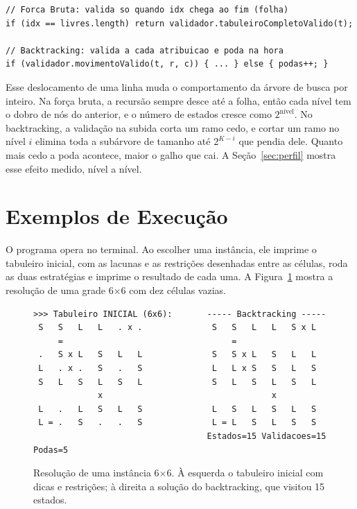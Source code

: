 \documentclass[12pt]{article}
\begin{document}
\begin{lstlisting}
// Forca Bruta: valida so quando idx chega ao fim (folha)
if (idx == livres.length) return validador.tabuleiroCompletoValido(t);

// Backtracking: valida a cada atribuicao e poda na hora
if (validador.movimentoValido(t, r, c)) { ... } else { podas++; }
\end{lstlisting}

Esse deslocamento de uma linha muda o comportamento da árvore de busca por inteiro. Na força bruta, a recursão sempre desce até a folha, então cada nível tem o dobro de nós do anterior, e o número de estados cresce como $2^{\text{nível}}$. No backtracking, a validação na subida corta um ramo cedo, e cortar um ramo no nível $i$ elimina toda a subárvore de tamanho até $2^{K-i}$ que pendia dele. Quanto mais cedo a poda acontece, maior o galho que cai. A Seção~\ref{sec:perfil} mostra esse efeito medido, nível a nível.

\section{Exemplos de Execução}
\label{sec:exemplos}

O programa opera no terminal. Ao escolher uma instância, ele imprime o tabuleiro inicial, com as lacunas e as restrições desenhadas entre as células, roda as duas estratégias e imprime o resultado de cada uma. A Figura~\ref{fig:exec6} mostra a resolução de uma grade 6$\times$6 com dez células vazias.

\begin{figure}[!ht]
\centering
\begin{footnotesize}
\begin{verbatim}
>>> Tabuleiro INICIAL (6x6):       ----- Backtracking -----
 S   S   L   L   . x .              S   S   L   L   S x L
     =                                  =
 .   S x L   S   L   L              S   S x L   S   L   L
 L   . x .   S   .   S              L   L x S   S   L   S
 S   L   S   L   S   L              S   L   S   L   S   L
             x                                  x
 L   .   L   S   L   S              L   S   L   S   L   S
 L = .   S   .   .   S              L = L   S   L   S   S
                                   Estados=15 Validacoes=15 Podas=5
\end{verbatim}
\end{footnotesize}
\caption{Resolução de uma instância 6$\times$6. À esquerda o tabuleiro inicial com dicas e restrições; à direita a solução do backtracking, que visitou 15 estados.}
\label{fig:exec6}
\end{figure}
\end{document}

